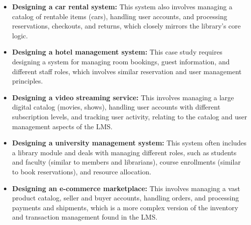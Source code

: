 \begin{itemize}
\item
\protect{}\label{f-AcX9zmNkEerLB6fBUQR}
\textbf{Designing a car rental system:} This system also involves managing a catalog of rentable items (cars), handling user accounts, and processing reservations, checkouts, and returns, which closely mirrors the library's core logic.
\item
\protect{}\label{kCh2opIrJXaiTX9xB2tUG}
\textbf{Designing a hotel management system:} This case study requires designing a system for managing room bookings, guest information, and different staff roles, which involves similar reservation and user management principles.
\item
\protect{}\label{r0wbSVs9m7drRL88oCtYq}
\textbf{Designing a video streaming service:} This involves managing a large digital catalog (movies, shows), handling user accounts with different subscription levels, and tracking user activity, relating to the catalog and user management aspects of the LMS.
\item
\protect{}\label{cuVkr9emHZxMvkgEa5H9N}
\textbf{Designing a university management system:} This system often includes a library module and deals with managing different roles, such as students and faculty (similar to members and librarians), course enrollments (similar to book reservations), and resource allocation.
\item
\protect{}\label{wBDSP3APLOzYGAx-EdKvm}
\textbf{Designing an e-commerce marketplace:} This involves managing a vast product catalog, seller and buyer accounts, handling orders, and processing payments and shipments, which is a more complex version of the inventory and transaction management found in the LMS.
\end{itemize}

